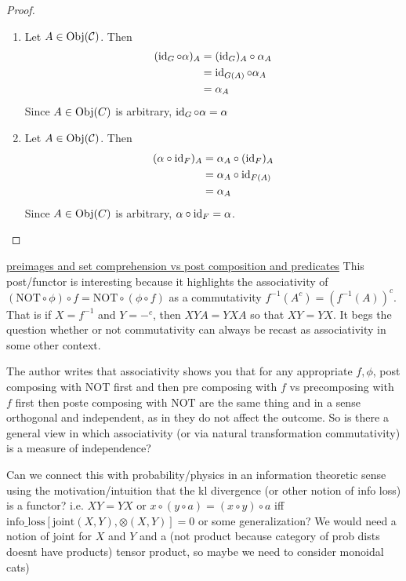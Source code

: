 \documentclass{book}
\begin{document}
	\begin{proof}\
		\begin{enumerate}
			\item Let $A \in \operatorname{Obj}(\mathcal{C})$. Then 
			\begin{align*}
				(\operatorname{id}_{G} \circ \alpha)_{A}
				& = (\operatorname{id}_G)_A \circ \alpha_A \\
				& = \operatorname{id}_{G(A)} \circ \alpha_A \\
				& = \alpha_A 
			\end{align*}
			Since $A \in \operatorname{Obj}(C)$ is arbitrary, $\operatorname{id}_{G} \circ \alpha = \alpha$
			\item Let $A \in \operatorname{Obj}(\mathcal{C})$. Then
			\begin{align*}
				(\alpha \circ \operatorname{id}_F)_{A}
				& = \alpha_A \circ (\operatorname{id}_F)_A \\
				& = \alpha_A \circ \operatorname{id}_{F(A)} \\
				& = \alpha_A 
			\end{align*}
			Since $A \in \operatorname{Obj}(C)$ is arbitrary, $\alpha \circ \operatorname{id}_F = \alpha$.
		\end{enumerate}
	\end{proof}
	
	\href{https://pseudonium.github.io/2026/01/20/Preimages_Preserve_Subset_operations.html}{preimages and set comprehension vs post composition and predicates}
	This post/functor is interesting because it highlights the associativity of $(\text{NOT} \circ \phi) \circ f = \text{NOT} \circ (\phi \circ f)$ as a commutativity $f^{-1}(A^c) = (f^{-1}(A))^c$. That is if $X = f^{-1}$ and $Y = -^c$, then $XYA = YXA$ so that $XY = YX$. It begs the question whether or not commutativity can always be recast as associativity in some other context. 
	
	
	The author writes that associativity shows you that for any appropriate $f, \phi$, post composing with $\text{NOT}$ first and then pre composing with $f$ vs precomposing with $f$ first then poste composing with $\text{NOT}$ are the same thing and in a sense orthogonal and independent, as in they do not affect the outcome. So is there a general view in which associativity (or via natural transformation commutativity) is a measure of independence? 
	
	Can we connect this with probability/physics in an information theoretic sense using the motivation/intuition that the kl divergence (or other notion of info loss) is a functor? i.e. $XY = YX$ or $x \circ (y \circ a) = (x \circ y) \circ a$ iff $\text{info\_loss}[\text{joint}(X,Y), \otimes(X,Y)] = 0$ or some generalization? We would need a notion of joint for $X$ and $Y$ and a (not product because category of prob dists doesnt have products) tensor product, so maybe we need to consider monoidal cats) 
	
\end{document}
